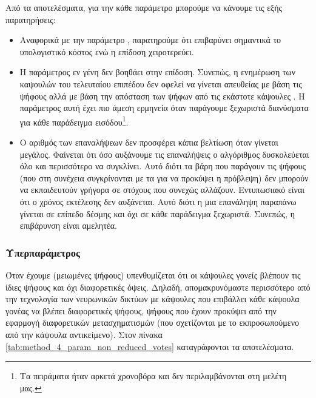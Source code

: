 Από τα αποτελέσματα, για την κάθε παράμετρο μπορούμε να κάνουμε τις εξής παρατηρήσεις:
\begin{itemize}
    \item Αναφορικά με την παράμετρο , παρατηρούμε ότι επιβαρύνει σημαντικά το υπολογιστικό κόστος ενώ η επίδοση χειροτερεύει.
    \item Η παράμετρος  εν γένη δεν βοηθάει στην επίδοση. Συνεπώς, η ενημέρωση των καψουλών του τελευταίου επιπέδου δεν οφελεί να γίνεται απευθείας με βάση τις ψήφους αλλά με βάση την απόσταση των ψήφων από τις εκάστοτε κάψουλες . Η παράμετρος αυτή έχει πιο άμεση ερμηνεία όταν παράγουμε ξεχωριστά διανύσματα  για κάθε παράδειγμα εισόδου\footnote{Τα πειράματα ήταν αρκετά χρονοβόρα και δεν περιλαμβάνονται στη μελέτη μας.}. 
    \item Ο αριθμός των επαναλήψεων δεν προσφέρει κάπια βελτίωση όταν γίνεται μεγάλος. Φαίνεται ότι όσο αυξάνουμε τις επαναλήψεις ο αλγόριθμος δυσκολεύεται όλο και περισσότερο να συγκλίνει. Αυτό διότι τα βάρη που παράγουν τις ψήφους (που στη συνέχεια συγκρίνονται με τα  για να προκύψει η πρόβλεψη) δεν μπορούν να εκπαιδευτούν γρήγορα σε στόχους που συνεχώς αλλάζουν. Εντυπωσιακό είναι ότι ο χρόνος εκτέλεσης δεν αυξάνεται. Αυτό διότι η μια επανάληψη παραπάνω γίνεται σε επίπεδο δέσμης και όχι σε κάθε παράδειγμα ξεχωριστά. Συνεπώς, η επιβάρυνση είναι αμελητέα. 
\end{itemize}

\subsubsection{Υπερπαράμετρος }
Όταν έχουμε  (μειωμένες ψήφους) υπενθυμίζεται ότι οι κάψουλες γονείς βλέπουν τις ίδιες ψήφους και όχι διαφορετικές όψεις. Δηλαδή, απομακρυνόμαστε περισσότερο από την τεχνολογία των νευρωνικών δικτύων με κάψουλες που επιβάλλει κάθε κάψουλα γονέας να βλέπει διαφορετικές ψήφους, ψήφους που έχουν προκύψει από την εφαρμογή διαφορετικών μετασχηματισμών (που σχετίζονται με το εκπροσωπούμενο από την κάψουλα αντικείμενο). Στον πίνακα \ref{tab:method_4_param_non_reduced_votes} καταγράφονται τα αποτελέσματα.\par


